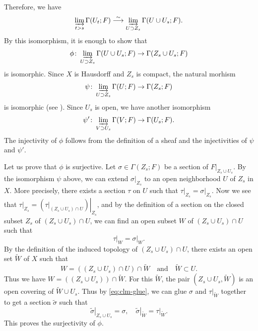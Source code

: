 ﻿\documentclass[a4paper,leqno]{jsarticle}
\makeatletter
\theoremstyle{definition}
\renewenvironment{proof}[1][\proofname]{\par
  \pushQED{\qed}%
  \normalfont \topsep6\p@\@plus6\p@\relax
  \trivlist
  \item[\hskip\labelsep
         \bfseries
    {#1}]\ignorespaces
}{%
  \popQED\endtrivlist\@endpefalse
}
\renewcommand{\proofname}{Proof.}
\numberwithin{equation}{section}
\newcommand{\simarr}{\mathrel{\overset{\sim}{\longrightarrow}}}%
\newcommand{\indlim}[1][]{\mathop{\varinjlim}\limits_{#1}}
\newcommand{\mres}[2][]{{\left.{#1}\right\rvert}_{#2}}
\theoremstyle{mystyle}
\makeatother
\begin{document}
\begin{proof}
\begin{proof}[Proof of Lemma \ref{clm:ind-nonchar}]
    Therefore, we have 
    \[
      \indlim[t>s]
      \Gamma(U_{t};F)
      \simarr
      \indlim[U\supset Z_{s}]
      \Gamma(U\cup U_{s};F).  
    \]
    By this isomorphism, it is enough to show that
    \[
      \phi\colon\indlim[U\supset Z_{s}]
      \Gamma(U\cup U_{s};F)
      \to
      \Gamma(Z_{s}\cup U_{s};F)
    \]
    is isomorphic.     
    Since \(X\) is Hausdorff and \(Z_{s}\) is compact, 
    the natural morhism 
    \[
      \psi\colon\indlim[U\supset Z_{s}]\Gamma(U;F)
      \to
      \Gamma(Z_{s};F)
    \]
    is isomorphic (see \cite[Proposition 2.5.1]{KS90}). 
    Since \(U_{s}\) is open, we have another isomorphism 
    \[
      \psi'\colon\indlim[V\supset U_{s}]\Gamma(V;F)
      \to
      \Gamma(U_{s};F).
    \] 
    The injectivity of \(\phi\) follows from 
    the definition of a sheaf 
    and the injectivities of \(\psi\) and \(\psi'\). 

    Let us prove that \(\phi\) is surjective. 
    Let \(\sigma\in \Gamma(Z_{s};F)\) be 
    a section of \(\mres[F]{Z_{s}\cup U_{s}}\). 
    By the isomorphism \(\psi\) above, 
    we can extend \(\mres[\sigma]{Z_{s}}\) to 
    an open neighborhood \(U\) of \(Z_{s}\) in \(X\). 
    More precisely, there exists a section 
    \(\tau\) on \(U\) such that \(
      \mres[\tau]{Z_{s}}=\mres[\sigma]{Z_{s}}
    \). 
    Now we see that \(
      \mres[\tau]{Z_{s}}
      =
      \mres[{(\mres[\tau]{(Z_{s}\cup U_{s})\cap U})}]{Z_{s}}
    \), and by the definition of a section 
    on the closed subset \(Z_{s}\) of 
    \((Z_{s}\cup U_{s})\cap U\), 
    we can find an open subset \(W\) of 
    \((Z_{s}\cup U_{s})\cap U\) 
    such that 
    \begin{equation}\label{eq:clm-glue}
      \mres[\tau]{W}=\mres[\sigma]{W}. 
    \end{equation}
    By the definition of the induced topology 
    of \((Z_{s}\cup U_{s})\cap U\), 
    there exists an open set \(\widetilde{W}\) of \(X\) 
    such that
    \[
      W=((Z_{s}\cup U_{s})\cap U)\cap \widetilde{W}
      \quad\text{and}\quad
      \widetilde{W}\subset U.
    \] 
    Thus we have \(W= ((Z_{s}\cup U_{s}))\cap \widetilde{W}\). 
    For this \(\widetilde{W}\), 
    the pair \(
      \left(Z_{s}\cup U_{s}, \widetilde{W}\right)
    \) is an open covering of \(\widetilde{W}\cup U_{s}\). 
    Thus by \eqref{eq:clm-glue}, we can 
    glue \(\sigma\) and \(\mres[\tau]{\widetilde{W}}\) together 
    to get a section \(\widetilde{\sigma}\) such that \[
      \mres[\widetilde{\sigma}]{Z_{s}\cup U_{s}} 
      =\sigma, 
      \quad
      \mres[\widetilde{\sigma}]{\widetilde{W}}
      =\mres[\tau]{\widetilde{W}}.
    \]
    This proves the surjectivity of \(\phi\). 


\end{proof}
\end{proof}
\end{document}
